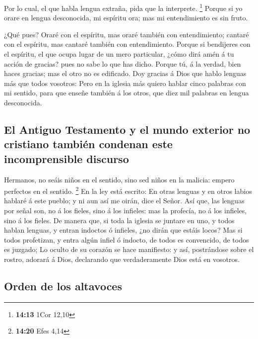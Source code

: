  Por lo cual, el que habla lengua extraña, pida que la
interprete. \footnote{\textbf{14:13} 1Cor 12,10}  Porque
si yo orare en lengua desconocida, mi espíritu ora; mas mi entendimiento
es sin fruto.

 ¿Qué pues? Oraré con el espíritu, mas oraré también con
entendimiento; cantaré con el espíritu, mas cantaré también con
entendimiento.  Porque si bendijeres con el espíritu, el
que ocupa lugar de un mero particular, ¿cómo dirá amén á tu acción de
gracias? pues no sabe lo que has dicho.  Porque tú, á la
verdad, bien haces gracias; mas el otro no es edificado. 
Doy gracias á Dios que hablo lenguas más que todos vosotros:
 Pero en la iglesia más quiero hablar cinco palabras con
mi sentido, para que enseñe también á los otros, que diez mil palabras
en lengua desconocida.

\hypertarget{el-antiguo-testamento-y-el-mundo-exterior-no-cristiano-tambiuxe9n-condenan-este-incomprensible-discurso}{%
\subsection{El Antiguo Testamento y el mundo exterior no cristiano
también condenan este incomprensible
discurso}\label{el-antiguo-testamento-y-el-mundo-exterior-no-cristiano-tambiuxe9n-condenan-este-incomprensible-discurso}}

 Hermanos, no seáis niños en el sentido, sino sed niños
en la malicia: empero perfectos en el sentido. \footnote{\textbf{14:20}
  Efes 4,14}  En la ley está escrito: En otras lenguas y
en otros labios hablaré á este pueblo; y ni aun así me oirán, dice el
Señor.  Así que, las lenguas por señal son, no á los
fieles, sino á los infieles: mas la profecía, no á los infieles, sino á
los fieles.  De manera que, si toda la iglesia se juntare
en uno, y todos hablan lenguas, y entran indoctos ó infieles, ¿no dirán
que estáis locos?  Mas si todos profetizan, y entra algún
infiel ó indocto, de todos es convencido, de todos es juzgado;
 Lo oculto de su corazón se hace manifiesto: y así,
postrándose sobre el rostro, adorará á Dios, declarando que
verdaderamente Dios está en vosotros.

\hypertarget{orden-de-los-altavoces}{%
\subsection{Orden de los altavoces}\label{orden-de-los-altavoces}}

